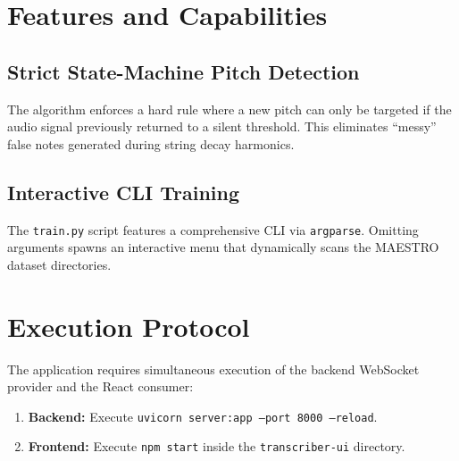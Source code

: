 \documentclass[12pt,a4paper]{article}
\begin{document}
\section{Features and Capabilities}

\subsection{Strict State-Machine Pitch Detection}
The algorithm enforces a hard rule where a new pitch can only be targeted if the audio signal previously returned to a silent threshold. This eliminates ``messy'' false notes generated during string decay harmonics. 

\subsection{Interactive CLI Training}
The \texttt{train.py} script features a comprehensive CLI via \texttt{argparse}. Omitting arguments spawns an interactive menu that dynamically scans the MAESTRO dataset directories.

\section{Execution Protocol}
The application requires simultaneous execution of the backend WebSocket provider and the React consumer:
\begin{enumerate}
    \item \textbf{Backend:} Execute \texttt{uvicorn server:app --port 8000 --reload}.
    \item \textbf{Frontend:} Execute \texttt{npm start} inside the \texttt{transcriber-ui} directory.
\end{enumerate}
\end{document}
